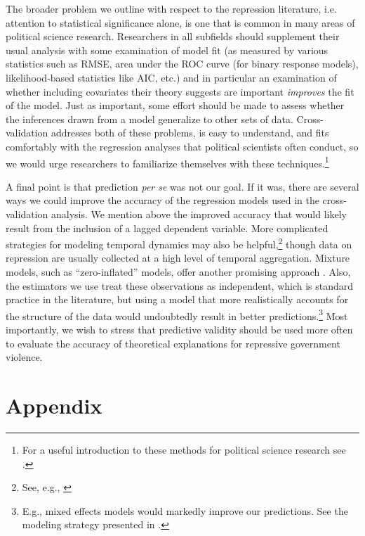 \documentclass[11pt]{article}
\begin{document}
The broader problem we outline with respect to the repression literature, i.e. attention to statistical significance alone, is one that is common in many areas of political science research. Researchers in all subfields should supplement their usual analysis with some examination of model fit (as measured by various statistics such as RMSE, area under the ROC curve (for binary response models), likelihood-based statistics like AIC, etc.) and in particular an examination of whether including covariates their theory suggests are important {\em improves} the fit of the model. Just as important, some effort should be made to assess whether the inferences drawn from a model generalize to other sets of data. Cross-validation addresses both of these problems, is easy to understand, and fits comfortably with the regression analyses that political scientists often conduct, so we would urge researchers to familiarize themselves with these techniques.\footnote{For a useful introduction to these methods for political science research see \citet{LeeAhlquist2011}.} 

A final point is that prediction {\it per se} was not our goal. If it was, there are several ways we could improve the accuracy of the regression models used in the cross-validation analysis. We mention above the improved accuracy that would likely result from the inclusion of a lagged dependent variable. More complicated strategies for modeling temporal dynamics may also be helpful,\footnote{See, e.g., \citep{Brandtetal2011}} though data on repression are usually collected at a high level of temporal aggregation. Mixture models, such as ``zero-inflated'' models, offer another promising approach \citep[See, e.g.][]{Bagozzietal,Bagozzi2013}. Also, the estimators we use treat these observations as independent, which is standard practice in the literature, but using a model that more realistically accounts for the structure of the data would undoubtedly result in better predictions.\footnote{E.g., mixed effects models would markedly improve our predictions. See the modeling strategy presented in \citet{Wardetal2012}.} Most importantly, we wish to stress that predictive validity should be used more often to evaluate the accuracy of theoretical explanations for repressive government violence.

\newpage
\begin{singlespace}


\end{singlespace}

\appendix
\section{Appendix}
\end{document}
